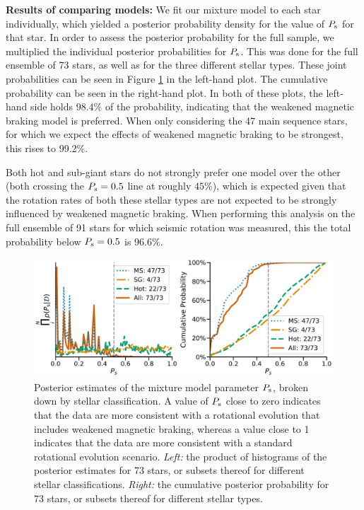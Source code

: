 \documentclass[12pt]{article}
\begin{document}
\textbf{Results of comparing models:} We fit our mixture model to each star individually, which yielded a posterior probability density for the value of $P_{\rm s}$ for that star. In order to assess the posterior probability for the full sample, we multiplied the individual posterior probabilities for $P_{\rm{s}}$. This was done for the full ensemble of 73 stars, as well as for the three different stellar types. These joint probabilities can be seen in Figure \ref{fig:gyroresults} in the left-hand plot. The cumulative probability can be seen in the right-hand plot. In both of these plots, the left-hand side holds 98.4\% of the probability, indicating that the weakened magnetic braking model is preferred. When only considering the 47 main sequence stars, for which we expect the effects of weakened magnetic braking to be strongest, this rises to 99.2\%. 

Both hot and sub-giant stars do not strongly prefer one model over the other (both crossing the $P_{\rm{s}} = 0.5$ line at roughly $45\%$), which is expected given that the rotation rates of both these stellar types are not expected to be strongly influenced by weakened magnetic braking. When performing this analysis on the full ensemble of 91 stars for which seismic rotation was measured, this the total probability below $P_{\rm{s}} = 0.5$ is 96.6\%. \\

\begin{figure}
	\centering
	\includegraphics[width=\textwidth]{modelresults.pdf}
	\caption{Posterior estimates of the mixture model parameter $P_{\rm s}$, broken down by stellar classification. A value of $P_{\rm s}$ close to zero indicates that the data are more consistent with a rotational evolution that includes weakened magnetic braking, whereas a value close to 1 indicates that the data are more consistent with a standard rotational evolution scenario. \textit{Left:} the product of histograms of the posterior estimates for 73 stars, or subsets thereof for different stellar classifications. \textit{Right:} the cumulative posterior probability for 73 stars, or subsets thereof for different stellar types.}
	\label{fig:gyroresults}
\end{figure}
\end{document}
